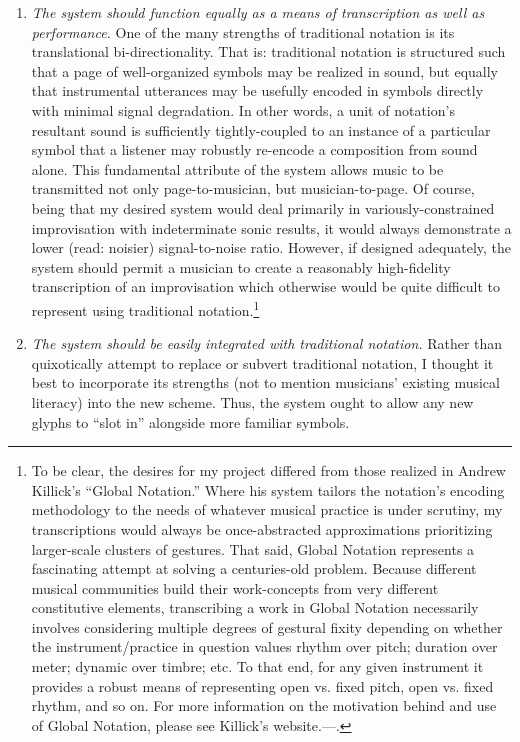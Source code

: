 \begin{enumerate}[label=(\roman*)]
        \item \textit{The system should function equally as a means of transcription as well as performance.}   One of the many strengths of traditional notation is its translational bi-directionality. That is: traditional notation is structured such that a page of well-organized symbols may be realized in sound, but equally that instrumental utterances may be usefully encoded in symbols directly with minimal signal degradation. In other words, a unit of notation's resultant sound is sufficiently tightly-coupled to an instance of a particular symbol that a listener may robustly re-encode a composition from sound alone. This fundamental attribute of the system allows music to be transmitted not only page-to-musician, but musician-to-page. Of course, being that my desired system would deal primarily in variously-constrained improvisation with indeterminate sonic results, it would always demonstrate a lower (read: noisier) signal-to-noise ratio. However, if designed adequately, the system should permit a musician to create a reasonably high-fidelity transcription of an improvisation which otherwise would be quite difficult to represent using traditional notation.\footnote{
            To be clear, the desires for my project differed from those realized in Andrew Killick's ``Global Notation.'' Where his system tailors the notation's encoding methodology to the needs of whatever musical practice is under scrutiny, my transcriptions would always be once-abstracted approximations prioritizing larger-scale clusters of gestures. That said, Global Notation represents a fascinating attempt at solving a centuries-old problem. Because different musical communities build their work-concepts from very different constitutive elements, transcribing a work in Global Notation necessarily involves considering multiple degrees of gestural fixity depending on whether the instrument/practice in question values rhythm over pitch; duration over meter; dynamic over timbre; etc. To that end, for any given instrument it provides a robust means of representing open vs. fixed pitch, open vs. fixed rhythm, and so on. For more information on the motivation behind and use of Global Notation, please see Killick's website.---\autocite{Killick}.
        }
        
        \item \textit{The system should be easily integrated with traditional notation.} Rather than quixotically attempt to replace or subvert traditional notation, I thought it best to incorporate its strengths (not to mention musicians' existing musical literacy) into the new scheme. Thus, the system ought to allow any new glyphs to ``slot in'' alongside more familiar symbols.
        

\end{enumerate}
